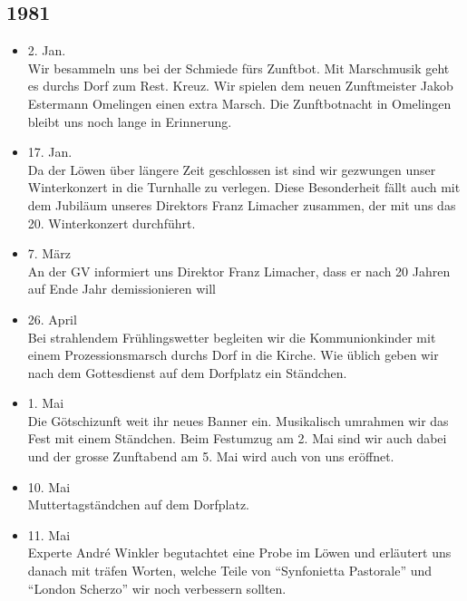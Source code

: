 \subsection*{1981}

\begin{history}


    \begin{itemize}

        \item 2. Jan.\\
              Wir besammeln uns bei der Schmiede fürs Zunftbot. Mit Marschmusik geht
              es durchs Dorf zum Rest. Kreuz. Wir spielen dem neuen Zunftmeister Jakob
              Estermann Omelingen einen extra Marsch. Die Zunftbotnacht in Omelingen
              bleibt uns noch lange in Erinnerung.

        \item 17. Jan.\\
              Da der Löwen über längere Zeit geschlossen ist sind wir gezwungen unser
              Winterkonzert in die Turnhalle zu verlegen. Diese Besonderheit fällt
              auch mit dem Jubiläum unseres Direktors Franz Limacher zusammen, der mit
              uns das 20. Winterkonzert durchführt.

        \item 7. März\\
              An der GV informiert uns Direktor Franz Limacher, dass er nach 20 Jahren
              auf Ende Jahr demissionieren will

        \item 26. April\\
              Bei strahlendem Frühlingswetter begleiten wir die Kommunionkinder mit
              einem Prozessionsmarsch durchs Dorf in die Kirche. Wie üblich geben wir
              nach dem Gottesdienst auf dem Dorfplatz ein Ständchen.

        \item 1. Mai\\
              Die Götschizunft weit ihr neues Banner ein. Musikalisch umrahmen wir das
              Fest mit einem Ständchen. Beim Festumzug am 2. Mai sind wir auch dabei
              und der grosse Zunftabend am 5. Mai wird auch von uns eröffnet.

        \item 10. Mai\\
              Muttertagständchen auf dem Dorfplatz.

        \item 11. Mai\\
              Experte André Winkler begutachtet eine Probe im Löwen und erläutert uns
              danach mit träfen Worten, welche Teile von \enquote{Synfonietta Pastorale} und
              \enquote{London Scherzo} wir noch verbessern sollten.


\end{itemize}
\end{history}
